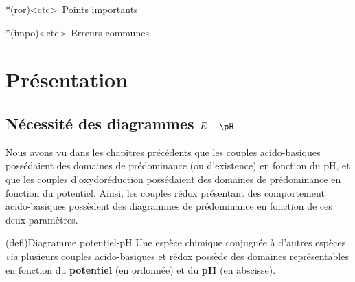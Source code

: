 \documentclass[a4paper, 10pt, landscape, twocolumn]{book}
\begin{document}
\begin{tcb}
	\begin{tcb}*(ror)<ctc>{\iconhart~Points importants}
	\end{tcb}
	\begin{tcb}*(impo)<ctc>{\iconimpo~Erreurs communes}
	\end{tcb}
\end{tcb}

\newpage

\section{Présentation}
\subsection{Nécessité des diagrammes $E-\pH$}
Nous avons vu dans les chapitres précédents que les couples acido-basiques
possédaient des domaines de prédominance (ou d'existence) en fonction du pH, et
que les couples d'oxydoréduction possédaient des domaines de prédominance en
fonction du potentiel. Ainsi, les couples rédox présentant des comportement
acido-basiques possèdent des diagrammes de prédominance en fonction de ces deux
paramètres.

\begin{tcb*}(defi){Diagramme potentiel-pH}
	Une espèce chimique conjuguée à d'autres espèces \textit{via} plusieurs
	couples acido-basiques et rédox possède des domaines représentables en
	fonction du \textbf{potentiel} (en ordonnée) et du \textbf{pH} (en abscisse).
\end{tcb*}
\end{document}
